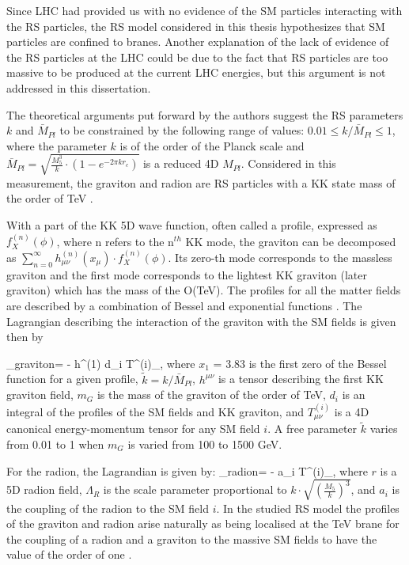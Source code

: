 Since LHC had provided us with no evidence of the SM particles interacting with the RS particles, the RS model considered in this thesis hypothesizes that SM particles are confined to branes. Another explanation of the lack of evidence of the RS particles at the LHC could be due to the fact that RS particles are too massive to be produced at the current LHC energies, but this argument is not addressed in this dissertation. 


The theoretical arguments put forward by the authors \cite{Davoudiasl:1999jd} suggest the RS parameters $k$ and $\bar{M}_{Pl}$ to be constrained by the following range of values: $0.01 \leq k / \bar{M}_{Pl} \leq 1$, where the parameter $k$ is of the order of the Planck scale and $\bar{M}_{Pl} = \sqrt{\frac{M^3_5}{k} \cdot (1 - e^{-2\pi k r_c} ) }$ is a reduced 4D $M_{Pl}$. Considered in this measurement, the graviton and radion are RS particles with a KK state mass of the order of TeV \cite{Oliveira:2014kla}. 

With a part of the KK 5D wave function, often called a profile, expressed as $f^{(n)}_X(\phi)$, where n refers to the n$^{th}$ KK mode, the graviton can be decomposed as $\sum_{n=0}^{\infty} h^{(n)}_{\mu\nu}(x_\mu) \cdot f^{(n)}_X(\phi)$. Its zero-th mode corresponds to the massless graviton and the first mode corresponds to the lightest KK graviton (later graviton) which has the mass of the O(TeV). The profiles for all the matter fields are described by a combination of Bessel and exponential functions \cite{Traczyk:2002jh, Goldberger:1999wh,Raychaudhuri:2126967}. The Lagrangian describing the interaction of the graviton with the SM fields is given then by 

\beqn\label{lagr_graviton}
\Lagr_{graviton}=  -  h^{\mu\nu(1)} \times d_i T^{(i)}_{\mu\nu},  
\eeqn
where $x_1$ = 3.83 is the first zero of the Bessel function for a given profile, $\tilde{k}  = k / \bar{M}_{Pl}$, $h^{\mu\nu}$ is a tensor describing the first KK graviton field, $m_G$ is the mass of the graviton of the order of TeV, $d_i$ is an integral of the profiles of the SM fields and KK graviton, and  $T^{(i)}_{\mu\nu}$ is a 4D canonical energy-momentum tensor \cite{Forger:2003ut} for any SM field $i$. A free parameter $\tilde{k}$ varies from 0.01 to 1 when $m_{G}$ is varied from 100 to 1500 GeV. 

For the radion, the Lagrandian is given by:
\beqn\label{lagr_radion}
\Lagr_{radion}=  -  \times a_i T^{\mu (i)}_{\mu},  
\eeqn
where $r$ is a 5D radion field, $\Lambda_R$ is the scale parameter proportional to $k \cdot \sqrt{ ( \frac{M_5}{k} )^3}$, and $a_i$ is the coupling of the radion to the SM field $i$. In the studied RS model the profiles of the graviton and radion arise naturally as being localised at the TeV brane for the coupling of a radion and a graviton to the massive SM fields to have the value of the order of one \cite{WED}. 


